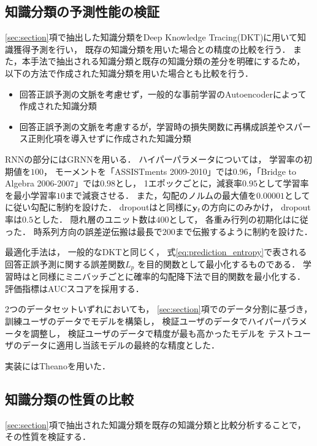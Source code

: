 \subsection{知識分類の予測性能の検証}

\ref{sec:section}項で抽出した知識分類をDeep Knowledge Tracing(DKT)に用いて知識獲得予測を行い，
既存の知識分類を用いた場合との精度の比較を行う．
また，本手法で抽出される知識分類と既存の知識分類の差分を明確にするため，
以下の方法で作成された知識分類を用いた場合とも比較を行う．
\begin{itemize}
\item 回答正誤予測の文脈を考慮せず，一般的な事前学習のAutoencoderによって作成された知識分類\label{c1}
\item 回答正誤予測の文脈を考慮するが，学習時の損失関数に再構成誤差やスパース正則化項を導入せずに作成された知識分類\label{c2}
\end{itemize}

RNNの部分にはGRNNを用いる．
ハイパーパラメータについては，
学習率の初期値を$100$，
モーメントを「ASSISTments 2009-2010」では$0.96$，「Bridge to Algebra 2006-2007」では$0.98$とし，
1エポックごとに，減衰率$0.95$として学習率を最小学習率$10$まで減衰させる．
また，勾配のノルムの最大値を$0.00001$として\cite{pascanu2013difficulty}に従い勾配に制約を設けた．
dropoutは\cite{piech2015deep}と同様に${\bf y}_t$の方向にのみかけ，
dropout率は$0.5$とした．
隠れ層のユニット数は$400$として，
各重み行列の初期化は\cite{glorot2010understanding}に従った．
時系列方向の誤差逆伝搬は最長で$200$まで伝搬するように制約を設けた．

最適化手法は，
一般的なDKTと同じく，
式\ref{eq:prediction_entropy}で表される回答正誤予測に関する誤差関数$L_p$
を目的関数として最小化するものである．
学習時は\cite{piech2015deep}と同様にミニバッチごとに確率的勾配降下法で目的関数を最小化する．
評価指標はAUCスコアを採用する．

2つのデータセットいずれにおいても，
\ref{sec:section}項でのデータ分割に基づき，
訓練ユーザのデータでモデルを構築し，
検証ユーザのデータでハイパーパラメータを調整し， 
検証ユーザのデータで精度が最も高かったモデルを
テストユーザのデータに適用し当該モデルの最終的な精度とした．

実装にはTheanoを用いた．


\subsection{知識分類の性質の比較}

\ref{sec:section}項で抽出された知識分類を既存の知識分類と比較分析することで，その性質を検証する．

